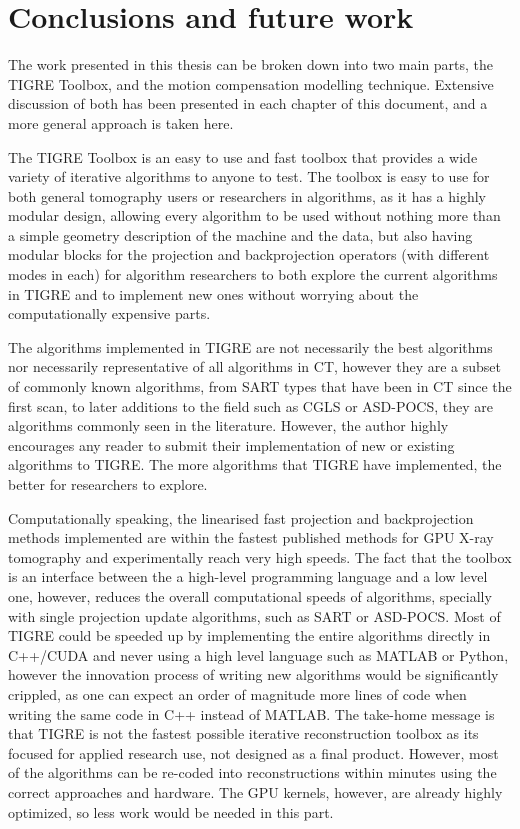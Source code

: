 \chapter{Conclusions and future work}

The work presented in this thesis can be broken down into two main parts, the TIGRE Toolbox, and the motion compensation modelling technique. Extensive discussion of both has been presented in each chapter of this document, and a more general approach is taken here. 

The TIGRE Toolbox is an easy to use and fast toolbox that provides a wide variety of iterative algorithms to anyone to test. The toolbox is easy to use for both general tomography users or researchers in algorithms, as it has a highly modular design, allowing every algorithm to be used without nothing more than a simple geometry description of the machine and the data, but also having modular blocks for the projection and backprojection operators (with different modes in each) for algorithm researchers to both explore the current algorithms in TIGRE and to implement new ones without worrying about the computationally expensive parts. 

The algorithms implemented in TIGRE are not necessarily the best algorithms nor necessarily representative of all algorithms in CT, however they are a subset of commonly known algorithms, from SART types that have been in CT since the first scan, to later additions to the field such as CGLS or ASD-POCS, they are algorithms commonly seen in the literature. However, the author highly encourages any reader to submit their implementation of new or existing algorithms to TIGRE. The more algorithms that TIGRE have implemented, the better for researchers to explore.

Computationally speaking, the linearised fast projection and backprojection methods implemented are within the fastest published methods for GPU X-ray tomography and experimentally reach very high speeds. The fact that the toolbox is an interface between the a high-level programming language and a low level one, however, reduces the overall computational speeds of algorithms, specially with single projection update algorithms, such as SART or ASD-POCS. Most of TIGRE could be speeded up by implementing the entire algorithms directly in C++/CUDA and never using a high level language such as MATLAB or Python, however the innovation process of writing new algorithms would be significantly crippled, as one can expect an order of magnitude more lines of code when writing the same code in C++ instead of MATLAB. The take-home message is that TIGRE is not the fastest possible iterative reconstruction toolbox as its focused for applied research use, not designed as a final product. However, most of the algorithms can be re-coded into reconstructions within minutes using the correct approaches and hardware. The GPU kernels, however, are already highly optimized, so less work would be needed in this part.

